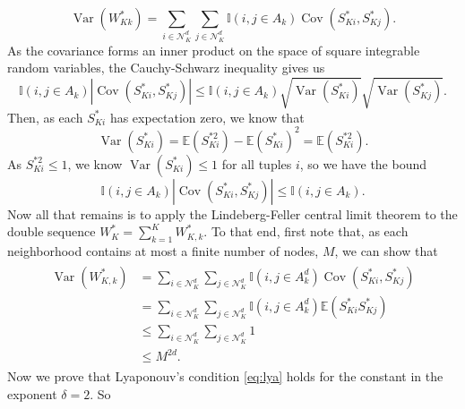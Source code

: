 \documentclass[12pt,twoside]{reedthesis}
\theoremstyle{definition}
\theoremstyle{definition}
\theoremstyle{remark}
\begin{document}
\begin{equation*}
\operatorname{Var}(W^{\ast}_{Kk}) = \sum_{i \in \mathcal{N}_{K}^d} \sum_{j \in \mathcal{N}_{K}^d} \mathbb{I}(i, j \in A_{k})  \operatorname{Cov}(S^{\ast}_{Ki}, S^{\ast}_{Kj}).
\end{equation*}
As the covariance forms an inner product on the space of square
integrable random variables, the Cauchy-Schwarz inequality gives us
\begin{equation}
  \mathbb{I}(i, j \in A_{k}) \left| \operatorname{Cov}(S^{\ast}_{Ki}, S^{\ast}_{Kj}) \right| \leq \mathbb{I}(i, j \in A_{k}) \sqrt{\operatorname{Var}(S^{\ast}_{Ki})} \sqrt{\operatorname{Var}(S^{\ast}_{Kj})}.
\end{equation}
Then, as each \(S^{\ast}_{Ki}\) has expectation zero, we know that
\begin{equation}
  \operatorname{Var}(S^{\ast}_{Ki}) = \mathbb{E}(S^{\ast 2}_{Ki}) - \mathbb{E}(S^{\ast}_{Ki})^2 = \mathbb{E}(S^{\ast 2}_{Ki}).
\end{equation}
As \(S^{\ast 2}_{Ki} \leq 1\), we know
\(\operatorname{Var}(S^{\ast}_{Ki}) \leq 1\) for all tuples \(i\), so we
have the bound
\begin{equation}
  \mathbb{I}(i, j \in A_{k}) \left| \operatorname{Cov}(S^{\ast}_{Ki}, S^{\ast}_{Kj}) \right| \leq  \mathbb{I}(i, j \in A_{k}).
\end{equation}
Now all that remains is to apply the Lindeberg-Feller central limit
theorem to the double sequence
\(W^{\ast}_{K} = {\sum_{k = 1}^{K} W^{\ast}_{K, k}}\). To that end,
first note that, as each neighborhood contains at most a finite number
of nodes, \(M\), we can show that
\begin{align}
    \begin{split}
    \operatorname{Var}(W^{\ast}_{K,k}) &= \sum_{i \in \mathcal{N}_{K}^d} \sum_{j \in \mathcal{N}_{K}^d} \mathbb{I}(i,j \in A_k^d) \operatorname{Cov}(S^{\ast}_{Ki}, S^{\ast}_{Kj}) \\
    &= \sum_{i \in \mathcal{N}_{K}^d} \sum_{j \in \mathcal{N}_{K}^d} \mathbb{I}(i,j \in A_k^d) \mathbb{E}(S^{\ast}_{Ki} S^{\ast}_{Kj}) \\
    &\leq \sum_{i \in \mathcal{N}_{K}^d} \sum_{j \in \mathcal{N}_{K}^d} 1 \\
    &\leq M^{2d}.
  \end{split}
\end{align}
Now we prove that Lyaponouv's condition \eqref{eq:lya} holds for the
constant in the exponent \(\delta = 2\). So
\end{document}
